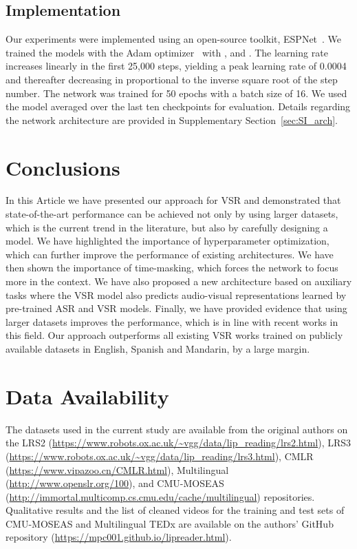 \documentclass[twocolumn]{article}
\begin{document}
\subsection{Implementation}
Our experiments were implemented using an open-source toolkit, ESPNet~\cite{watanabe2018espnet}. We trained the models with the Adam optimizer~\cite{kingma2014adam} with ,  and . The learning rate increases linearly in the first 25,000 steps, yielding a peak learning rate of 0.0004 and thereafter decreasing in proportional to the inverse square root of the step number. The network was trained for 50 epochs with a batch size of 16. We used the model averaged over the last ten checkpoints for evaluation. Details regarding the network architecture are provided in Supplementary Section~\ref{sec:SI_arch}.

\section{Conclusions}
In this Article we have presented our approach for VSR and demonstrated that state-of-the-art performance can be achieved not only by using larger datasets, which is the current trend in the literature, but also by carefully designing a model. We have highlighted the importance of hyperparameter optimization, which can further improve the performance of existing architectures. We have then shown the importance of time-masking, which forces the network to focus more in the context. We have also proposed a new architecture based on auxiliary tasks where the VSR model also predicts audio-visual representations learned by pre-trained ASR and VSR models. Finally, we have provided evidence that using larger datasets improves the performance, which is in line with recent works in this field. Our approach outperforms all existing VSR works trained on publicly available datasets in English, Spanish and Mandarin, by a large margin.

\section*{Data Availability} 

The datasets used in the current study are available from the original authors on the LRS2 (\url{https://www.robots.ox.ac.uk/~vgg/data/lip_reading/lrs2.html}), LRS3 (\url{https://www.robots.ox.ac.uk/~vgg/data/lip_reading/lrs3.html}), CMLR (\url{https://www.vipazoo.cn/CMLR.html}), Multilingual  (\url{http://www.openslr.org/100}), and CMU-MOSEAS (\url{http://immortal.multicomp.cs.cmu.edu/cache/multilingual}) repositories. Qualitative results and the list of cleaned videos for the training and test sets of CMU-MOSEAS and Multilingual TEDx are available on the authors’ GitHub repository (\url{https://mpc001.github.io/lipreader.html}).
\end{document}
